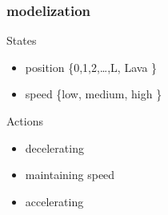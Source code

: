 \documentclass[dvipsnames,svgnames]{beamer}
\begin{document}
\begin{frame}
\frametitle{modelization}
\begin{block}{States}
\begin{itemize}
\item \pause position \{0,1,2,\ldots ,L, Lava  \}
\item \pause speed    \{low, medium, high   \}
\end{itemize}
\end{block}
\pause
\begin{block}{Actions}
\begin{itemize}
\item \pause decelerating 
\item \pause maintaining speed
\item \pause accelerating 
\end{itemize}
\end{block}
\end{frame}
\end{document}
